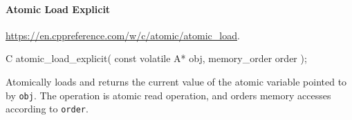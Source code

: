 \paragraph{Atomic Load Explicit}

\url{https://en.cppreference.com/w/c/atomic/atomic_load}.

\begin{nicec}
C atomic_load_explicit( const volatile A* obj, memory_order order );
\end{nicec}
Atomically loads and returns the current value of
the atomic variable pointed to by \texttt{obj}.
The operation is atomic read operation,
and  orders memory accesses according to \texttt{order}.
